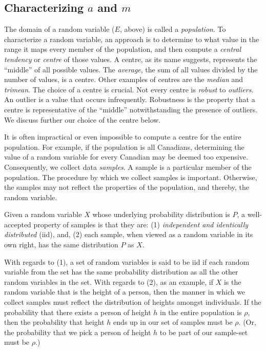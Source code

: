 \subsection*{Characterizing $a$ and $m$}\label{sec:statictics:charac}
The domain of a random variable ($E$, above) is called a
\emph{population}. To characterize a random variable, an approach
is to determine to what value in the range it maps every member of
the population, and then compute a \emph{central tendency} or
\emph{centre} of those values.
A centre, as its name suggests, represents the ``middle'' of
all possible values. The \emph{average}, the sum of all values
divided by the number of values, is a centre. Other examples of
centres are the \emph{median} and \emph{trimean}.
The choice of a centre is crucial. Not every centre is
\emph{robust} to \emph{outliers}. An outlier is a value
that occurs infrequently. Robustness is the property that
a centre is representative of the ``middle'' notwithstanding
the presence of outliers. We discuss further our choice
of the centre below.

It is often impractical or even impossible to compute a
centre for the entire population. For example, if the population
is all Canadians, determining the value of a random variable
for every Canadian may be deemed too expensive.
Consequently, we collect data \emph{samples}.
A sample is a particular member of the population.
The procedure by which we collect samples is important. Otherwise,
the samples may not reflect the properties of the population,
and thereby, the random variable.

Given a random variable $X$ whose underlying
probability distribution is $P$, a well-accepted property of
samples is that they are: (1) \emph{independent and identically
distributed} (iid), and, (2) each sample, when viewed as a
random variable
in its own right, has the same distribution $P$ as $X$.

With regards to (1),
a set of random variables is said to be iid if each random
variable from the set has the same probability distribution
as all the other random variables in the set.
With regards to (2), as an example,
if $X$ is the random variable that is the height
of a person, then the manner in which we collect samples must
reflect the distribution of heights amongst individuals.
If the probability that there exists a person of height $h$ in
the entire population is $\rho$, then the probability that height
$h$ ends up in our set of samples must be $\rho$.
(Or, the probability that we pick a person of height $h$ to be
part of our sample-set must be $\rho$.)

